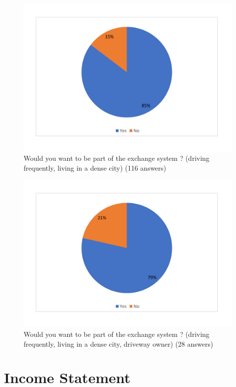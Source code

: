 \documentclass[12pt,a4paper,oneside]{book}
\begin{document}
\begin{figure}[h]
\centering
\caption{Would you want to be part of the exchange system ? (driving frequently, living in a dense city) (116 answers)}
\label{partres}
\includegraphics[keepaspectratio=true,width=\textwidth-4cm]{../graph/part.pdf}
\end{figure}

\begin{figure}[h]
\centering
\caption{Would you want to be part of the exchange system ? (driving frequently, living in a dense city, driveway owner) (28 answers)}
\label{pratdrivewayres}
\includegraphics[keepaspectratio=true,width=\textwidth-4cm]{../graph/partdriveway.pdf}
\end{figure}

\chapter{Income Statement}
\label{is}
\end{document}
